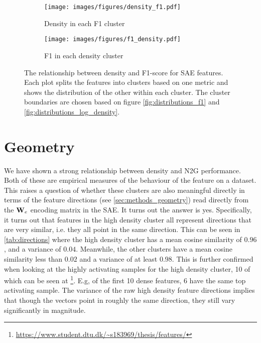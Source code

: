 \begin{figure}[ht]
    \centering
    
    \begin{subfigure}[b]{0.45\textwidth}
        \centering
        \texttt{[image: images/figures/density\_f1.pdf]}
        \caption{Density in each F1 cluster}
        \label{fig:density_f1}
    \end{subfigure}
    \begin{subfigure}[b]{0.45\textwidth}
        \centering
        \texttt{[image: images/figures/f1\_density.pdf]}
        \caption{F1 in each density cluster}
        \label{fig:f1_density}
    \end{subfigure}
    
    \caption{The relationship between density and F1-score for SAE features.
    Each plot splits the features into clusters based on one metric and shows the distribution of the other within each cluster.
    The cluster boundaries are chosen based on figure \ref{fig:distributions_f1} and \ref{fig:distributions_log_density}.}
    \label{fig:density_f1_cluster_check}
\end{figure}

\section{Geometry}
We have shown a strong relationship between density and N2G performance.
Both of these are empirical measures of the behaviour of the feature on a dataset.
This raises a question of whether these clusters are also meaningful directly in terms of the feature directions (see \autoref{sec:methods_geometry}) read directly from the $\mathbf{W}_e$ encoding matrix in the SAE.
It turns out the answer is yes.
Specifically, it turns out that features in the high density cluster all represent directions that are very similar, i.e. they all point in the same direction.
This can be seen in \autoref{tab:directions} where the high density cluster has a mean cosine similarity of $0.96$, and a variance of $0.04$.
Meanwhile, the other clusters have a mean cosine similarity less than $0.02$ and a variance of at least $0.98$.
This is further confirmed when looking at the highly activating samples for the high density cluster, 10 of which can be seen at \footnote{\url{https://www.student.dtu.dk/~s183969/thesis/features/}}.
E.g, of the first 10 dense features, 6 have the same top activating sample.
The variance of the raw high density feature directions implies that though the vectors point in roughly the same direction, they still vary significantly in magnitude.

